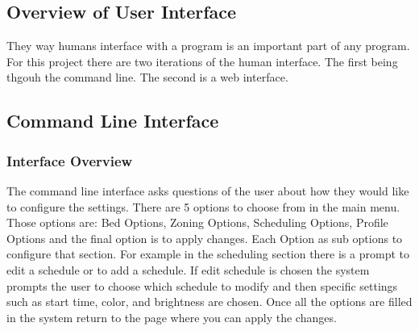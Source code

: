 			        \subsection{Overview of User Interface}
			        They way humans interface with a program is an important part of any program.
			        For this project there are two iterations of the human interface. The
			        first being thgouh the command line. The second is a web interface.
			        \subsection{Command Line Interface}
			            \subsubsection{Interface Overview}
			            The command line interface asks questions of the user about how they
			            would like to configure the settings. There are 5 options to
			            choose from in the main menu. Those options are: Bed Options, Zoning Options,
			            Scheduling Options, Profile Options and the final option is to apply changes.
			            Each Option as sub options to configure that section. For example in the
			            scheduling section there is a prompt to edit a schedule or to add a schedule.
			            If edit schedule is chosen the system prompts the user to choose which
			            schedule to modify and then specific settings such as start time, color, and brightness are chosen.
			            Once all the options are filled in the system return to the page where you can apply the changes.
